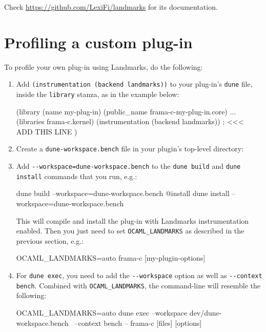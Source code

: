 Check \url{https://github.com/LexiFi/landmarks} for its documentation.

\section{Profiling a custom plug-in}

To profile your own plug-in using Landmarks, do the following:

\begin{enumerate}
\item Add \verb|(instrumentation (backend landmarks))| to your plug-in's
  \verb|dune| file, inside the \verb|library| stanza, as in the example below:
\begin{dunecode}
 (library
   (name my-plug-in)
   (public_name frama-c-my-plug-in.core)
   ...
   (libraries frama-c.kernel)
   (instrumentation (backend landmarks)) ; <<< ADD THIS LINE
 )
\end{dunecode}
\item Create a \verb|dune-workspace.bench| file in your plugin's top-level
  directory:
\item Add \verb|--workspace=dune-workspace.bench| to the \verb|dune build|
  and \verb|dune install| commands that you run, e.g.:
\begin{logs}
dune build --workspace=dune-workspace.bench @install
dune install --workspace=dune-workspace.bench
\end{logs}
This will compile and install the plug-in with Landmarks instrumentation
enabled. Then you just need to set \verb|OCAML_LANDMARKS| as described in the
previous section, e.g.:
\begin{logs}
OCAML_LANDMARKS=auto frama-c [my-plugin-options]
\end{logs}
\item For \verb|dune exec|, you need to add the \verb|--workspace| option
  as well as \verb|--context bench|. Combined with \verb|OCAML_LANDMARKS|,
  the command-line will resemble the following:
\begin{logs}
OCAML_LANDMARKS=auto dune exec --workspace dev/dune-workspace.bench \
  --context bench -- frama-c [files] [options]
\end{logs}
\end{enumerate}
